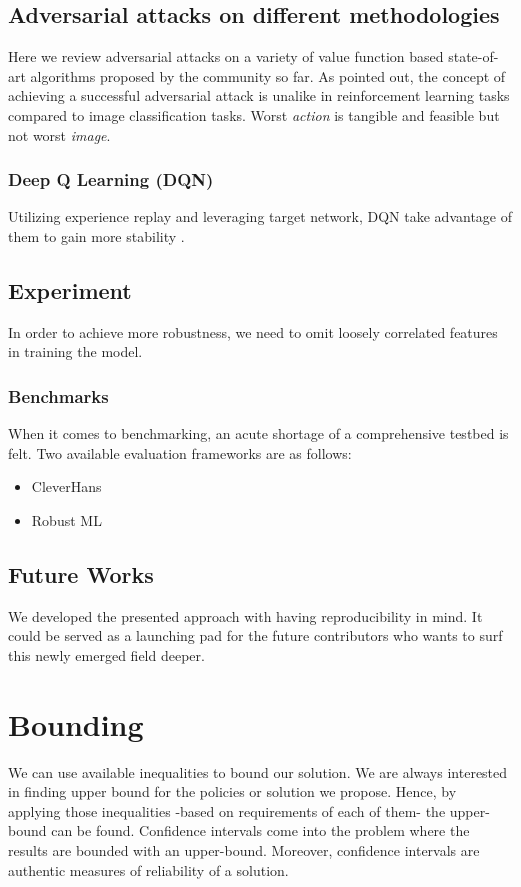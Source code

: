 \documentclass[a4paper,12pt]{article}
\begin{document}
\subsection{Adversarial attacks on different methodologies}
Here we review adversarial attacks on a variety of value function based state-of-art algorithms proposed by the community so far. As \citet{Pattanaik2018} pointed out, the concept of achieving a successful adversarial attack is unalike in reinforcement learning tasks compared to image classification tasks. Worst \textit{action} is tangible and feasible but not worst \textit{image}.

\subsubsection{Deep Q Learning (DQN)}
Utilizing experience replay and leveraging target network, DQN take advantage of them to gain more stability \cite{Pattanaik2018}.

\subsection{Experiment}
In order to achieve more robustness, we need to omit loosely correlated features in training the model.

\subsubsection{Benchmarks}
When it comes to benchmarking, an acute shortage of a comprehensive testbed is felt. Two available evaluation frameworks are as follows:
\begin{itemize}
    \item CleverHans \cite{Papernot2016}
    \item Robust ML 
\end{itemize}
 

\subsection{Future Works}
We developed the presented approach with having reproducibility in mind. It could be served as a launching pad for the future contributors who wants to surf this newly emerged field deeper.


\section{Bounding}
We can use available inequalities to bound our solution. We are always interested in finding upper bound for the policies or solution we propose. Hence, by applying those inequalities -based on requirements of each of them- the upper-bound can be found. Confidence intervals come into the problem where the results are bounded with an upper-bound. Moreover, confidence intervals are authentic measures of reliability of a solution.
\end{document}
